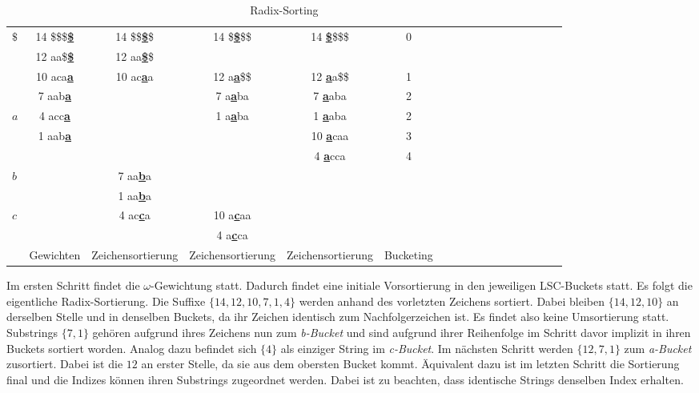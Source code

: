 \begin{table}[H]
\centering
\begin{adjustbox}{width=1\textwidth}
  \begin{tabular}{ | l | c | c | c | c | c | c | c | c | c | c | c | c | c | c | c | c | }
    \hline
       $\$$ & 14 \$\$\$\textbf{\underline{\$}} & 14 \$\$\textbf{\underline{\$}}\$ & 14 \$\textbf{\underline{\$}}\$\$ & 14 \textbf{\underline{\$}}\$\$\$ & 0 \\
            & 12 aa\$\textbf{\underline{\$}} & 12 aa\textbf{\underline{\$}}\$ & & & \\ \hline
            & 10 aca\textbf{\underline{a}} & 10 ac\textbf{\underline{a}}a & 12 a\textbf{\underline{a}}\$\$ & 12 \textbf{\underline{a}}a\$\$ & 1 \\
            & 7 aab\textbf{\underline{a}} & & 7 a\textbf{\underline{a}}ba & 7 \textbf{\underline{a}}aba & 2 \\
        $a$ & 4 acc\textbf{\underline{a}} & & 1 a\textbf{\underline{a}}ba & 1 \textbf{\underline{a}}aba & 2  \\
            & 1 aab\textbf{\underline{a}} & & & 10 \textbf{\underline{a}}caa & 3 \\
            & & & & 4 \textbf{\underline{a}}cca & 4  \\ \hline
        $b$ & & 7 aa\textbf{\underline{b}}a & & & \\
            & & 1 aa\textbf{\underline{b}}a & & & \\ \hline
        $c$ & & 4 ac\textbf{\underline{c}}a & 10 a\textbf{\underline{c}}aa & & \\
            & & & 4 a\textbf{\underline{c}}ca & & \\ \hline
            & Gewichten & Zeichensortierung & Zeichensortierung & Zeichensortierung & Bucketing \\
    \hline
  \end{tabular}
  \end{adjustbox}
  \caption{Radix-Sorting}
\end{table}
\bigskip

\noindent Im ersten Schritt findet die $\omega$-Gewichtung statt. Dadurch findet eine initiale Vorsortierung in den jeweiligen LSC-Buckets statt. Es folgt die eigentliche Radix-Sortierung. Die Suffixe $\{14, 12, 10, 7, 1 , 4\}$ werden anhand des vorletzten Zeichens sortiert. Dabei bleiben $\{14, 12, 10\}$ an derselben Stelle und in denselben Buckets, da ihr Zeichen identisch zum Nachfolgerzeichen ist. Es findet also keine Umsortierung statt. Substrings $\{7, 1\}$ gehören aufgrund ihres Zeichens nun zum \textit{b-Bucket} und sind aufgrund ihrer Reihenfolge im Schritt davor implizit in ihren Buckets sortiert worden. Analog dazu befindet sich $\{4\}$ als einziger String im \textit{c-Bucket}.
Im nächsten Schritt werden $\{12, 7, 1\}$ zum \textit{a-Bucket} zusortiert. Dabei ist die $12$ an erster Stelle, da sie aus dem obersten Bucket kommt. Äquivalent dazu ist im letzten Schritt die Sortierung final und die Indizes können ihren Substrings zugeordnet werden. Dabei ist zu beachten, dass identische Strings denselben Index erhalten.

